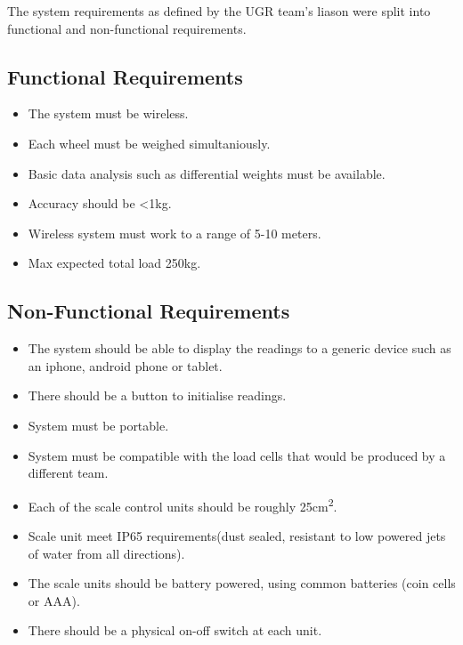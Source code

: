 The system requirements as defined by the UGR team's liason were split into functional and non-functional requirements.

\subsection{Functional Requirements}
\label{functional}
\begin{itemize}
\item The system must be wireless.
\item Each wheel must be weighed simultaniously.
\item Basic data analysis such as differential weights must be available.
\item Accuracy should be \textless 1kg.
\item Wireless system must work to a range of 5-10 meters.
\item Max expected total load 250kg.
\end{itemize}

\subsection{Non-Functional Requirements}
\label{non-functional}
\begin{itemize}
\item The system should be able to display the readings to a generic device such as an iphone, android phone or tablet. 
\item There should be a button to initialise readings.
\item System must be portable.
\item System must be compatible with the load cells that would be produced by a different team.
\item Each of the scale control units should be roughly 25cm\textsuperscript{2}.
\item Scale unit meet IP65 requirements(dust sealed, resistant to low powered jets of water from all directions).
\item The scale units should be battery powered, using common batteries (coin cells or AAA).
\item There should be a physical on-off switch at each unit.
\end{itemize}
